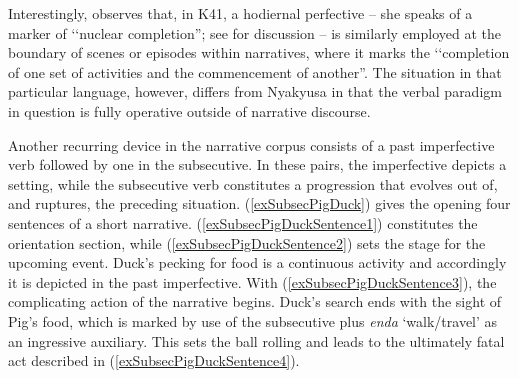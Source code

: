 Interestingly, \citet[143f]{CraneTM2011} observes that, in  K41, a hodiernal perfective -- she speaks of a marker of \lq\lq nuclear completion''; see  for discussion -- is similarly employed at the boundary of scenes or episodes within narratives, where it marks the \lq\lq completion of one set of activities and the commencement of another''. The situation in that particular language, however, differs from Nyakyusa in that the verbal paradigm in question is fully operative outside of narrative discourse.

Another recurring device in the narrative corpus consists of a past imperfective verb followed by one in the subsecutive. In these pairs, the imperfective depicts a setting, while the subsecutive verb constitutes a progression that evolves out of, and ruptures, the preceding situation. (\ref{exSubsecPigDuck}) gives the opening four sentences of a short narrative. (\ref{exSubsecPigDuckSentence1}) constitutes the orientation section, while (\ref{exSubsecPigDuckSentence2}) sets the stage for the upcoming event. Duck's pecking for food is a continuous activity and accordingly it is depicted in the past imperfective. With (\ref{exSubsecPigDuckSentence3}), the complicating action of the narrative begins. Duck's search ends with the sight of Pig's food, which is marked by use of the subsecutive plus \textit{enda} `walk/travel' as an ingressive auxiliary. This sets the ball rolling and leads to the ultimately fatal act described in (\ref{exSubsecPigDuckSentence4}).

